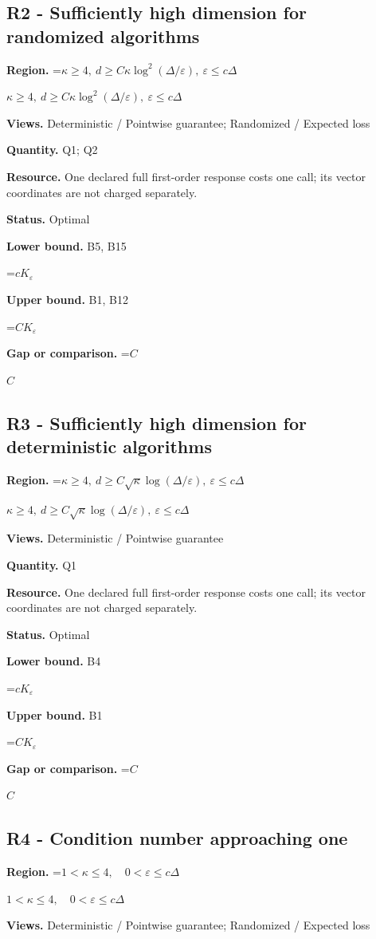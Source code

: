 \documentclass[10pt,a4paper]{article}
\newcommand{\AtlasMath}[1]{\par\begingroup\centering\setbox0=\hbox{$\displaystyle #1$}\ifdim\wd0>1.4\linewidth\typeout{ATLAS WIDE FORMULA: \the\wd0}\fi\ifdim\wd0>\linewidth\resizebox{\linewidth}{!}{\box0}\else\box0\fi\par\endgroup}
\newcommand{\AtlasInlineMath}[1]{\begingroup\setbox0=\hbox{$#1$}\ifdim\wd0>.4\linewidth\endgroup\AtlasMath{#1}\else\endgroup$#1$\fi}
\begin{document}
\subsection{R2 - Sufficiently high dimension for randomized algorithms}
\textbf{Region.} \AtlasInlineMath{\kappa\ge4,\ d\ge C\kappa\log^2(\Delta/\varepsilon),\ \varepsilon\le c\Delta}

\textbf{Views.} Deterministic / Pointwise guarantee; Randomized / Expected loss

\textbf{Quantity.} Q1; Q2

\textbf{Resource.} One declared full first-order response costs one call; its vector coordinates are not charged separately.

\textbf{Status.} Optimal

\textbf{Lower bound.} B5, B15

\AtlasMath{c K_\varepsilon}
\textbf{Upper bound.} B1, B12

\AtlasMath{C K_\varepsilon}
\textbf{Gap or comparison.} \AtlasInlineMath{C}

\subsection{R3 - Sufficiently high dimension for deterministic algorithms}
\textbf{Region.} \AtlasInlineMath{\kappa\ge4,\ d\ge C\sqrt\kappa\log(\Delta/\varepsilon),\ \varepsilon\le c\Delta}

\textbf{Views.} Deterministic / Pointwise guarantee

\textbf{Quantity.} Q1

\textbf{Resource.} One declared full first-order response costs one call; its vector coordinates are not charged separately.

\textbf{Status.} Optimal

\textbf{Lower bound.} B4

\AtlasMath{c K_\varepsilon}
\textbf{Upper bound.} B1

\AtlasMath{C K_\varepsilon}
\textbf{Gap or comparison.} \AtlasInlineMath{C}

\subsection{R4 - Condition number approaching one}
\textbf{Region.} \AtlasInlineMath{1<\kappa\le4,\quad0<\varepsilon\le c\Delta}

\textbf{Views.} Deterministic / Pointwise guarantee; Randomized / Expected loss
\end{document}
